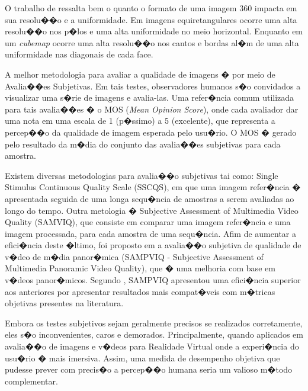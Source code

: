\documentclass[12pt]{article}
\begin{document}



O trabalho de \cite{dunn2017resolution} ressalta bem o quanto o formato de uma imagem 360 impacta em sua resolu��o e a uniformidade. Em imagens equiretangulares ocorre uma alta resolu��o nos p�los e uma alta uniformidade no meio horizontal. Enquanto em um \textit{cubemap} ocorre uma alta resolu��o nos cantos e bordas al�m de uma alta uniformidade nas diagonais de cada face.

A melhor metodologia para avaliar a qualidade de imagens � por meio de Avalia��es Subjetivas. Em tais testes, observadores humanos s�o convidados a visualizar uma s�rie de imagens e avalia-las. Uma refer�ncia comum utilizada para tais avalia��es � o MOS (\textit{Mean Opinion Score}), onde cada avaliador dar uma nota em uma escala de 1 (p�ssimo) a 5 (excelente), que representa a percep��o da qualidade de imagem esperada pelo usu�rio. O MOS � gerado pelo resultado da m�dia do conjunto das avalia��es subjetivas para cada amostra.

Existem diversas metodologias para avalia��o subjetivas tai como: Single Stimulus Continuous Quality Scale (SSCQS), em que uma imagem refer�ncia � apresentada seguida de uma longa sequ�ncia de amostras a serem avaliadas ao longo do tempo. Outra metologia � Subjective Assessment of Multimedia Video Quality (SAMVIQ), que consiste em comparar uma imagem refer�ncia e uma imagem processada, para cada amostra de uma sequ�ncia. Afim de aumentar a efici�ncia deste �ltimo, foi proposto em \cite{zhang2017subjective} a avalia��o subjetiva de qualidade de v�deo de m�dia panor�mica (SAMPVIQ - Subjective Assessment of Multimedia Panoramic Video Quality), que � uma melhoria com base em v�deos panor�micos. Segundo \cite{zhang2017subjective}, SAMPVIQ apresentou uma efici�ncia superior aos anteriores por apresentar resultados mais compat�veis com m�tricas objetivas presentes na literatura.

Embora os testes subjetivos sejam geralmente precisos se realizados corretamente, eles s�o inconvenientes, caros e demorados. Principalmente, quando aplicados em avalia��o de imagens e v�deos para Realidade Virtual onde a experi�ncia do usu�rio � mais imersiva. Assim, uma medida de desempenho objetiva que pudesse prever com precis�o a percep��o humana seria um valioso m�todo complementar.
\end{document}
